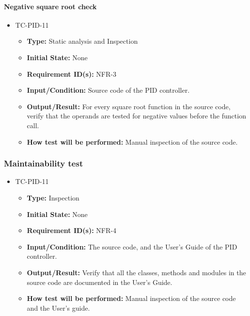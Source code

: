 \documentclass[12pt, titlepage]{article}
\begin{document}
\paragraph{Negative square root check}
\begin{itemize}
\item{TC-PID-11\\}
\begin{itemize}
\item{\textbf{Type:}} Static analysis and Inspection
					
\item{\textbf{Initial State:}} None

\item{\textbf{Requirement ID(s):}} NFR-3
					
\item{\textbf{Input/Condition:}}  Source code of the PID controller.
					
\item{\textbf{Output/Result:}} For every square root function in the source code,
verify that the operands are tested for negative values before the function call.

\item{\textbf{How test will be performed:}}  Manual inspection of the source code.
\end{itemize}
\end{itemize}
\subsubsection{Maintainability test}

\begin{itemize}
\item{TC-PID-11\\}
\begin{itemize}
\item{\textbf{Type:}} Inspection
					
\item{\textbf{Initial State:}} None

\item{\textbf{Requirement ID(s):}} NFR-4
					
\item{\textbf{Input/Condition:}}  The source code, and the User's Guide of the PID controller.
					
\item{\textbf{Output/Result:}} Verify that all the classes, methods and modules in the source
code are documented in the User's Guide.

\item{\textbf{How test will be performed:}}  Manual inspection of the source code and the 
User's guide.
\end{itemize}
\end{itemize}
\end{document}
